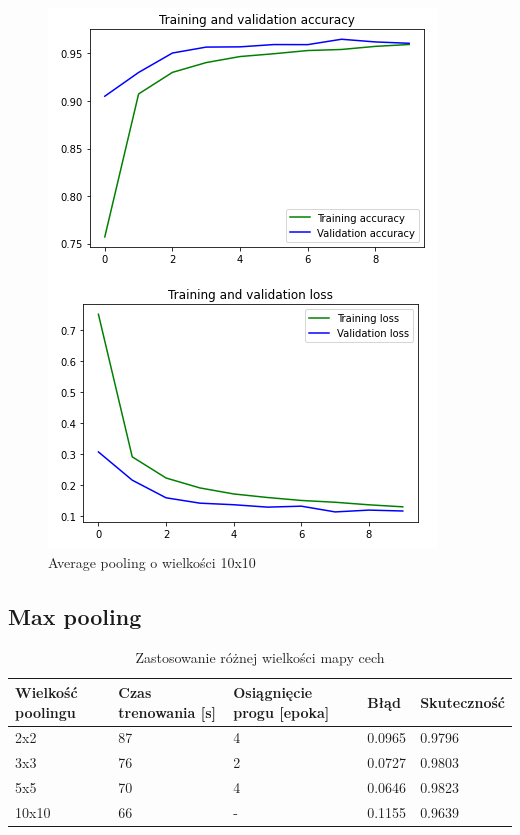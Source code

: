 \documentclass{article}
\begin{document}
\begin{figure}[h]
  \centering
  \includegraphics[width=\linewidth]{pooling_10_10.png}
  \caption{Average pooling o wielkości 10x10}
\end{figure}

\subsection{Max pooling}

\begin{table}[h]
  \centering
    
  \bgroup
  \def\arraystretch{1.3}
\begin{tabular}{|l|l|l|l|l|}
\hline
Wielkość poolingu & Czas trenowania [s] & Osiągnięcie progu [epoka] & Błąd & Skuteczność \\ \hline
2x2 & 87 & 4 & 0.0965 & 0.9796 \\ \hline
3x3 & 76 & 2 & 0.0727 & 0.9803 \\ \hline
5x5 & 70 & 4 & 0.0646 & 0.9823 \\ \hline
10x10 & 66 & - & 0.1155 & 0.9639 \\ \hline
\end{tabular}
  \egroup
  \vspace{10pt}
  \caption{Zastosowanie różnej wielkości mapy cech}
\end{table}
\end{document}
